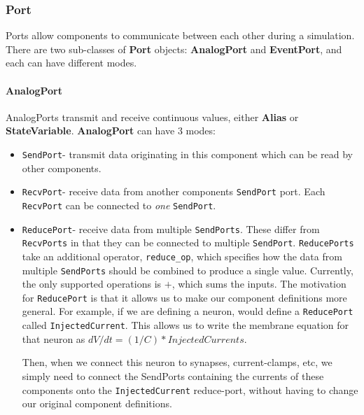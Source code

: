 \documentclass{article}
\newcommand{\nmlClass}[1]{{\bf #1}}
\newcommand{\StateVariable}{{\bf{StateVariable}}\xspace}
\newcommand{\Alias}{{\bf{Alias}}\xspace}
\newcommand{\AnalogPort}{{\bf{AnalogPort}}\xspace}
\newcommand{\SendPort}{{\tt{SendPort}}\xspace}
\newcommand{\RecvPort}{{\tt{RecvPort}}\xspace}
\newcommand{\ReducePort}{{\tt{ReducePort}}\xspace}
\newcommand{\SendPorts}{{\tt{SendPorts}}\xspace}
\newcommand{\RecvPorts}{{\tt{RecvPorts}}\xspace}
\newcommand{\ReducePorts}{{\tt{ReducePorts}}\xspace}
\begin{document}
\subsubsection{Port}

Ports allow components to communicate between each other during a simulation.
There are two sub-classes of \nmlClass{Port} objects: \nmlClass{AnalogPort}
and \nmlClass{EventPort}, and each can have different modes.

\paragraph{AnalogPort}

AnalogPorts transmit and receive continuous values, either \Alias
or \StateVariable. \AnalogPort can have 3 modes:
\begin{itemize}
\item \SendPort - transmit data originating in this component which can
be read by other components.
\item \RecvPort - receive data from another components \SendPort
port. Each \RecvPort can be connected to \emph{one} \SendPort.
\item \ReducePort - receive data from multiple \SendPorts. These
differ from \RecvPorts in that they can be connected to multiple
\SendPort. \ReducePorts take an additional operator,
{\tt reduce\_op}, which specifies how the data from multiple \SendPorts
should be combined to produce a single value. Currently, the
only supported operations is $+$, which sums the inputs.
The motivation for \ReducePort is that it allows us to make our
component definitions more general. For example, if we are defining a
neuron, would define a \ReducePort called {\tt InjectedCurrent}.
This allows us to write the membrane equation for that neuron as
$dV/dt = (1/C) * InjectedCurrents$.

Then, when we connect this neuron to synapses, current-clamps, etc, we
simply need to connect the SendPorts containing the currents of these
components onto the {\tt InjectedCurrent} reduce-port, without having
to change our original component definitions.
\end{itemize}

\end{document}
